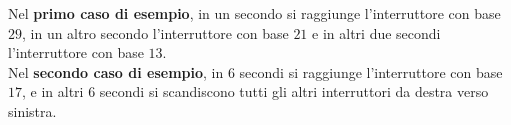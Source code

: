 

\Examples
\begin{example}
%
%
\end{example}


\Explanation
Nel \textbf{primo caso di esempio}, in un secondo si raggiunge l'interruttore con base $29$, in un altro secondo l'interruttore con base $21$ e in altri due secondi l'interruttore con base $13$.\\[2mm]
Nel \textbf{secondo caso di esempio}, in 6 secondi si raggiunge l'interruttore con base $17$, e in altri 6 secondi si scandiscono tutti gli altri interruttori da destra verso sinistra.
